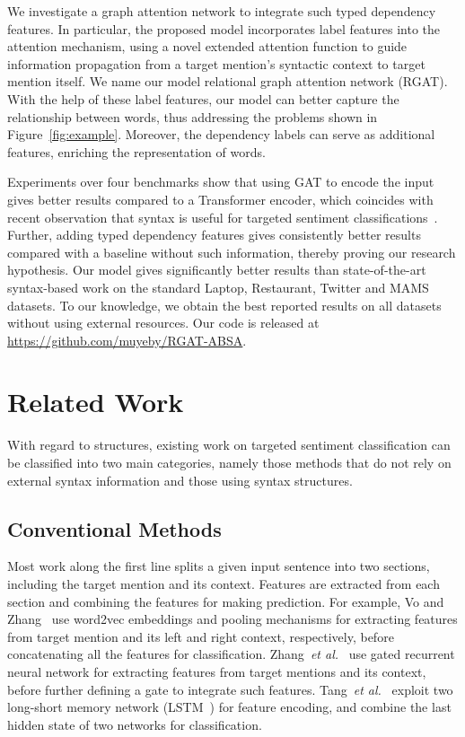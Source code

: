 \documentclass[journal]{IEEEtran}
\begin{document}
	We investigate a graph attention network to integrate such typed dependency features. 
	In particular, the proposed model incorporates label features into the attention mechanism, using a novel extended attention function to guide information propagation from a target mention's syntactic context to target mention itself. 
	We name our model relational graph attention network (RGAT).
	With the help of these label features,  our model can better capture the relationship between words, thus addressing the problems shown in Figure~\ref{fig:example}.
	Moreover, the dependency labels can serve as additional features, enriching the representation of words. 
	
	Experiments over four benchmarks show that using GAT to encode the input gives better results compared to a Transformer encoder, which coincides with recent observation that syntax is useful for targeted sentiment classifications~\cite{sun-etal-2019-aspect,huang-carley-2019-syntax,zhang-etal-2019-aspect}. 
	Further, adding typed dependency features gives consistently better results compared with a baseline without such information, thereby proving our research hypothesis. 
	{
		Our model gives significantly better results than  state-of-the-art syntax-based work on the standard Laptop, Restaurant, Twitter and MAMS datasets.
	} 
	To our knowledge, we obtain the best reported results on all datasets without using external resources.
	Our code is released at \url{https://github.com/muyeby/RGAT-ABSA}.
	
	\section{Related Work}
	With regard to structures, existing work on targeted sentiment classification can be classified into two main categories, namely those methods that do not rely on external syntax information and those using syntax structures.
	\subsection{Conventional Methods}
	Most work along the first line splits a given input sentence into two sections, including the target mention and its context. Features are extracted from each section and combining the features for making prediction. 
	For example, Vo and Zhang~\cite{Vo2015TargetDependentTS} use word2vec embeddings and pooling mechanisms for extracting features from target mention and its left and right context, respectively, before concatenating all the features for classification.
	Zhang~\textit{et al.}~\cite{Zhang2016GatedNN} use gated recurrent neural network for extracting features from target mentions and its context, before further defining a gate to integrate such features.
	Tang~\textit{et al.}~\cite{tang-etal-2016-effective} exploit two long-short memory network (LSTM~\cite{HochSchm97}) for feature encoding, and combine the last hidden state of two networks for classification.
	
\end{document}

